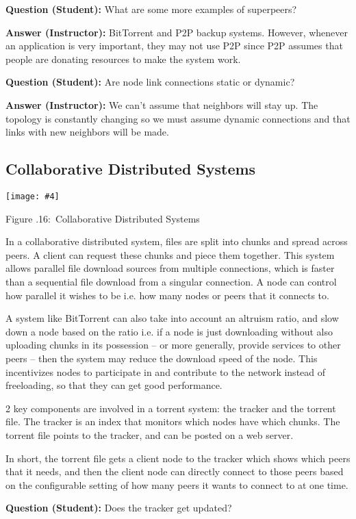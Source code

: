 \documentclass[twoside]{article}
\newcounter{lecnum}
\newcommand{\fig}[4]{
            \centerline{\texttt{[image: \#4]}}
            \begin{center}
            Figure \thelecnum.#1:~#3
            \end{center}
    }
\begin{document}
\textbf{Question (Student): } What are some more examples of superpeers?

\textbf{Answer (Instructor): } BitTorrent and P2P backup systems. However, whenever an application is very important, they may not use P2P since P2P assumes that people are donating resources to make the system work.

\textbf{Question (Student): } Are node link connections static or dynamic?

\textbf{Answer (Instructor): } We can't assume that neighbors will stay up. The topology is constantly changing so we must assume dynamic connections and that links with new neighbors will be made.


\subsection{Collaborative Distributed Systems}
\fig{16}{0.5}{Collaborative Distributed Systems}{collab.png}

In a collaborative distributed system, files are split into chunks and spread across peers. A client can request these chunks and piece them together. This system allows parallel file download sources from multiple connections, which is faster than a sequential file download from a singular connection. A node can control how parallel it wishes to be i.e. how many nodes or peers that it connects to.

A system like BitTorrent can also take into account an altruism ratio, and slow down a node based on the ratio i.e. if a node is just downloading without also uploading chunks in its possession  -- or more generally, provide services to other peers --  then the system may reduce the download speed of the node. This incentivizes nodes to participate in and contribute to the network instead of freeloading, so that they can get good performance.

2 key components are involved in a torrent system: the tracker and the torrent file. The tracker is an index that monitors which nodes have which chunks. The torrent file points to the tracker, and can be posted on a web server. 

In short, the torrent file gets a client node to the tracker which shows which peers that it needs, and then the client node can directly connect to those peers based on the configurable setting of how many peers it wants to connect to at one time.

\textbf{Question (Student): } Does the tracker get updated?
\end{document}
